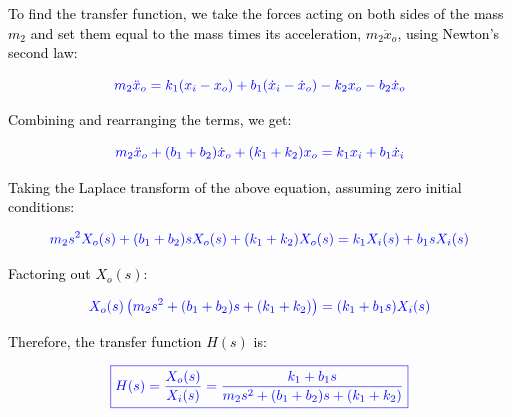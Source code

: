 \documentclass{article}
\begin{document}
\noindent
\textcolor{black}{To find the transfer function, we take the forces acting on both sides of the mass \( m_2 \) and set them equal to the mass times its acceleration, \( m_2 \ddot{x}_o \), using Newton’s second law:}

\[
	\textcolor{blue}{m_2 \ddot{x}_o = k_1 (x_i - x_o) + b_1 (\dot{x}_i - \dot{x}_o) - k_2 x_o - b_2 \dot{x}_o}
\]

\noindent
\textcolor{black}{Combining and rearranging the terms, we get:}

\[
	\textcolor{blue}{m_2 \ddot{x}_o + (b_1 + b_2) \dot{x}_o + (k_1 + k_2) x_o = k_1 x_i + b_1 \dot{x}_i}
\]

\noindent
\textcolor{black}{Taking the Laplace transform of the above equation, assuming zero initial conditions:}

\[
	\textcolor{blue}{m_2 s^2 X_o(s) + (b_1 + b_2) s X_o(s) + (k_1 + k_2) X_o(s) = k_1 X_i(s) + b_1 s X_i(s)}
\]

\noindent
\textcolor{black}{Factoring out \( X_o(s) \):}

\[
	\textcolor{blue}{X_o(s) \left( m_2 s^2 + (b_1 + b_2) s + (k_1 + k_2) \right) = (k_1 + b_1 s) X_i(s)}
\]

\noindent
\textcolor{black}{Therefore, the transfer function \( H(s) \) is:}

\[
	\textcolor{blue}{\boxed{H(s) = \frac{X_o(s)}{X_i(s)} = \frac{k_1 + b_1 s}{m_2 s^2 + (b_1 + b_2) s + (k_1 + k_2)}}}
\]
\end{document}
